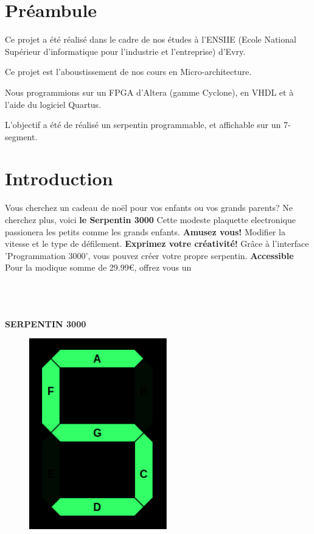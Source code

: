 \documentclass[10pt]{article}
\begin{document}
    \tableofcontents
    \section*{Préambule}
    Ce projet a été réalisé dans le cadre de nos études à l'ENSIIE (Ecole National Supérieur d'informatique pour l'industrie et l'entreprise) d'Evry.
    
    Ce projet est l'aboustissement de nos cours en Micro-architecture.
    
    Nous programmions sur un FPGA d'Altera (gamme Cyclone), en VHDL et à l'aide du logiciel Quartus.
    
    L'objectif a été de réalisé un serpentin programmable, et affichable sur un 7-segment.

    \newpage
    \section{Introduction}
    Vous cherchez un cadeau de noël pour vos enfants ou vos grands parents?
    \newline
    Ne cherchez plus, voici \textbf{le Serpentin 3000}
    \newline
    Cette modeste plaquette electronique passionera les petits comme les grands enfants.
    \newline
    \newline
    \textbf{Amusez vous!}
    \newline
    Modifier la vitesse et le type de défilement.
    \newline
    \newline
    \textbf{Exprimez votre créativité!}
    \newline
    Grâce à l'interface 'Programmation 3000', vous pouvez créer votre propre serpentin.
    \newline
    \newline
    \textbf{Accessible}
    Pour la modique somme de 29.99€, offrez vous un\\
    \\
    \\
    \\
    \centerline{\textbf{SERPENTIN 3000}}
    \newline
    \newline
    \begin{figure}[h!]
        \includegraphics[width=6cm]{logo.png}
    \end{figure}
\end{document}
